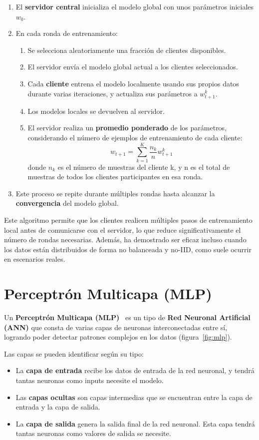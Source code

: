 \begin{enumerate}
    \item El \textbf{servidor central} inicializa el modelo global con unos parámetros iniciales \(w_0\).
    \item En cada ronda de entrenamiento:
    \begin{enumerate}
        \item Se selecciona aleatoriamente una fracción de clientes disponibles.
        \item El servidor envía el modelo global actual a los clientes seleccionados.
        \item Cada \textbf{cliente} entrena el modelo localmente usando sus propios datos durante varias iteraciones, y actualiza sus parámetros a 
        \(w_{t+1}^k\).
        \item Los modelos locales se devuelven al servidor.
        \item El servidor realiza un \textbf{promedio ponderado} de los parámetros, considerando el número de ejemplos de entrenamiento de cada cliente: \[w_{t+1} = \sum_{k = 1}^{K} \frac{n_k}{n} w_{t+1}^k\] donde \(n_k\) es el número de muestras del cliente k, y n es el total de muestras de todos los clientes participantes en esa ronda.
    \end{enumerate}
    \item Este proceso se repite durante múltiples rondas hasta alcanzar la \textbf{convergencia} del modelo global.
\end{enumerate}

Este algoritmo permite que los clientes realicen múltiples pasos de entrenamiento local antes de comunicarse con el servidor, lo que reduce significativamente el número de rondas necesarias. Además, ha demostrado ser eficaz incluso cuando los datos están distribuidos de forma no balanceada y no-IID, como suele ocurrir en escenarios reales.

\section{Perceptrón Multicapa (MLP)}
\label{sec:MLP}
Un \textbf{Perceptrón Multicapa (MLP)}~\cite{perceptron_multicapa} es un tipo de \textbf{Red Neuronal Artificial (ANN)} que consta de varias capas de neuronas interconectadas entre sí, logrando poder detectar patrones complejos en los datos (figura~\ref{fig:mlp}).

Las capas se pueden identificar según su tipo:
\begin{itemize}
    \item La \textbf{capa de entrada} recibe los datos de entrada de la red neuronal, y tendrá tantas neuronas como inputs necesite el modelo.
    \item  Las \textbf{capas ocultas} son capas intermedias que se encuentran entre la capa de entrada y la capa de salida.
    \item La \textbf{capa de salida} genera la salida final de la red neuronal. Esta capa tendrá tantas neuronas como valores de salida se necesite.
\end{itemize}

